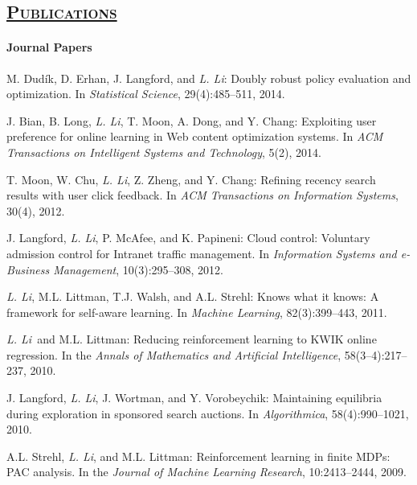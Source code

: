\documentclass[10pt,twoside,letterpaper]{article}
\newcommand{\selffont}[1]{{\textit{#1}}}
\newcommand{\venuefont}[1]{{\textit{#1}}}
\newcommand{\negitemspace}{\vspace{1mm}}
\newcommand{\myself}{\selffont{L. Li}}
\begin{document}
\subsection*{\textsc{\underline{Publications}}
}

\paragraph{Journal Papers} \negitemspace

\begin{compactenum}[(J1)]

\item{M. Dud\'ik, D. Erhan, J. Langford, and \myself: Doubly robust policy evaluation and optimization.  In \venuefont{Statistical Science}, 29(4):485--511, 2014.}

\item{J. Bian, B. Long, \myself, T. Moon, A. Dong, and Y. Chang: Exploiting user preference for online learning in Web content optimization systems.  In \venuefont{ACM Transactions on Intelligent Systems and Technology}, 5(2), 2014.}

\item{T. Moon, W. Chu, \myself, Z. Zheng, and Y. Chang: Refining recency search results with user click feedback.  In \venuefont{ACM Transactions on Information Systems}, 30(4), 2012.}

\item{J. Langford, \myself, P. McAfee, and K. Papineni: Cloud control: Voluntary admission control for Intranet traffic management.  In \venuefont{Information Systems and e-Business Management}, 10(3):295--308, 2012.}

\item{\myself, M.L. Littman, T.J. Walsh, and A.L. Strehl:
Knows what it knows: A framework for self-aware learning.  In \venuefont{Machine Learning}, 82(3):399--443, 2011.}

\item{\myself\ and M.L. Littman: Reducing reinforcement learning
to KWIK online regression.  In the \venuefont{Annals of Mathematics and
Artificial Intelligence}, 58(3--4):217--237, 2010.}

\item{J. Langford, \myself, J. Wortman, and Y.
Vorobeychik: Maintaining equilibria during exploration in
sponsored search auctions.  In \venuefont{Algorithmica},
58(4):990--1021, 2010.}

\item{A.L. Strehl, \myself, and M.L. Littman:
Reinforcement learning in finite MDPs: PAC analysis.  In the
\venuefont{Journal of Machine Learning Research}, 10:2413--2444, 2009.}


\end{compactenum}
\end{document}
